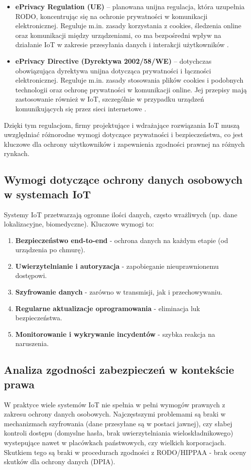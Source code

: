 \begin{itemize}
\item \textbf{ePrivacy Regulation (UE)} – planowana unijna regulacja, która uzupełnia RODO, koncentrując się na ochronie prywatności w komunikacji elektronicznej. Reguluje m.in. zasady korzystania z cookies, śledzenia online oraz komunikacji między urządzeniami, co ma bezpośredni wpływ na działanie IoT w zakresie przesyłania danych i interakcji użytkowników \cite{eprivacyreg}.

\item \textbf{ePrivacy Directive (Dyrektywa 2002/58/WE)} – dotychczas obowiązująca dyrektywa unijna dotycząca prywatności i łączności elektronicznej. Reguluje m.in. zasady stosowania plików cookies i podobnych technologii oraz ochronę prywatności w komunikacji online. Jej przepisy mają zastosowanie również w IoT, szczególnie w przypadku urządzeń komunikujących się przez sieci internetowe \cite{eprivacydir}.

\end{itemize}

Dzięki tym regulacjom, firmy projektujące i wdrażające rozwiązania IoT muszą uwzględniać różnorodne wymogi dotyczące prywatności i bezpieczeństwa, co jest kluczowe dla ochrony użytkowników i zapewnienia zgodności prawnej na różnych rynkach.

\subsection{Wymogi dotyczące ochrony danych osobowych w systemach IoT}
Systemy IoT przetwarzają ogromne ilości danych, często wrażliwych (np. dane lokalizacyjne, biomedyczne). Kluczowe wymogi to:
\begin{enumerate}
    \item \textbf{Bezpieczeństwo end-to-end} - ochrona danych na każdym etapie (od urządzenia po chmurę).
    \item \textbf{Uwierzytelnianie i autoryzacja} - zapobieganie nieuprawnionemu dostępowi.
    \item \textbf{Szyfrowanie danych} - zarówno w transmisji, jak i przechowywaniu.
    \item \textbf{Regularne aktualizacje oprogramowania} - eliminacja luk bezpieczeństwa.
    \item \textbf{Monitorowanie i wykrywanie incydentów} - szybka reakcja na naruszenia.
\end{enumerate}

\subsection{Analiza zgodności zabezpieczeń w kontekście prawa}
W praktyce wiele systemów IoT nie spełnia w pełni wymogów prawnych z zakresu ochrony danych osobowych. Najczęstszymi problemami są braki w mechanizmach szyfrowania (dane przesyłane są w postaci jawnej), czy słabej kontroli dostępu (domyslne hasła, brak uwierzytelniania wieloskładnikowego) wystepujące nawet w placówkach państwowych, czy wielkich korporacjach. Skutkiem tego są braki w procedurach zgodności z RODO/HIPPAA - brak oceny skutków dla ochrony danych (DPIA). 

